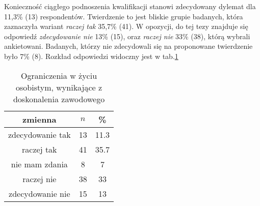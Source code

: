

 Konieczność ciągłego podnoszenia kwalifikacji stanowi zdecydowany dylemat dla 11,3\% (13) respondentów. Twierdzenie to jest bliskie grupie badanych, która zaznaczyła wariant \textit{raczej tak} 35,7\% (41). W opozycji, do tej tezy znajduje się odpowiedź \textit{zdecydowanie nie} 13\% (15), oraz \textit{raczej nie} 33\% (38), którą wybrali ankietowani. Badanych, którzy nie zdecydowali się na proponowane twierdzenie było 7\% (8). Rozkład odpowiedzi widoczny jest w tab.\ref{tab:Q14}

\begin{table}[H]
\caption{Ograniczenia w życiu osobistym, wynikające z doskonalenia zawodowego}
\centering
\begin{tabular}{ | c | c | c |}
\hline
zmienna & $n$ & \% \\
\hline
zdecydowanie tak  &  13  & 11.3 \\
\hline
raczej tak  &  41  & 35.7 \\
\hline
nie mam zdania  &  8  & 7 \\
\hline
raczej nie  &  38  & 33 \\
\hline
zdecydowanie nie  &  15  & 13 \\
\hline
\end{tabular}
\label{tab:Q14}
\end{table}
